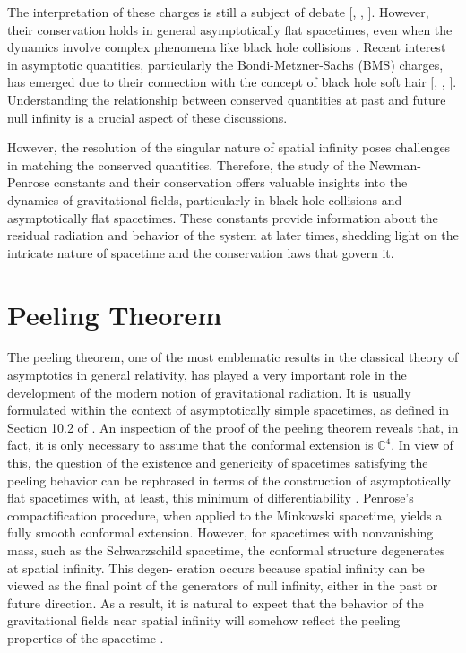 The interpretation of these charges is still a subject of debate [\cite{PenRin84}, \cite{DaiVal02}, \cite{Bac10}]. However, their conservation holds in
general asymptotically flat spacetimes, even when the dynamics involve complex phenomena like black hole
collisions \cite{DaiVal02}. Recent interest in asymptotic quantities, particularly the Bondi-Metzner-Sachs (BMS) charges,
has emerged due to their connection with the concept of black hole soft hair [\cite{HawMalStr16}, \cite{HawMalStr17}, \cite{HeLyMi15}]. Understanding the relationship between conserved quantities at past and future null infinity is a crucial aspect of these discussions.

However, the resolution of the singular nature of spatial infinity poses challenges in matching the conserved
quantities.
Therefore, the study of the Newman-Penrose constants and their conservation offers valuable insights into the
dynamics of gravitational fields, particularly in black hole collisions and asymptotically flat spacetimes. These
constants provide information about the residual radiation and behavior of the system at later times, shedding
light on the intricate nature of spacetime and the conservation laws that govern it.

\section{Peeling Theorem}
\label{sec:Peeling Theorem}

The peeling theorem, one of the most emblematic results in the classical theory of asymptotics in general relativity, has played a very important role in the development of the modern notion of gravitational radiation. It
is usually formulated within the context of asymptotically simple spacetimes, as defined in Section 10.2 of \cite{Val16}.
An inspection of the proof of the peeling theorem reveals that, in fact, it is only necessary to assume that the
conformal extension is $\mathbb{C}^4$. In view of this, the question of the existence and genericity of spacetimes satisfying the peeling behavior can be rephrased in terms of the construction of asymptotically flat spacetimes with, at least, this minimum of differentiability \cite{GasVal17}. Penrose’s compactification procedure, when applied to the
Minkowski spacetime, yields a fully smooth conformal extension. However, for spacetimes with nonvanishing
mass, such as the Schwarzschild spacetime, the conformal structure degenerates at spatial infinity. This degen-
eration occurs because spatial infinity can be viewed as the final point of the generators of null infinity, either
in the past or future direction. As a result, it is natural to expect that the behavior of the gravitational fields near
spatial infinity will somehow reflect the peeling properties of the spacetime \cite{Pen65a}.

